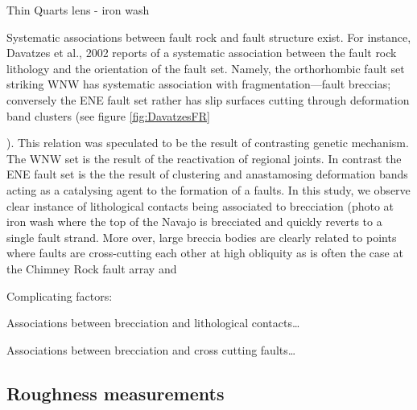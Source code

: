 \documentclass[12pt,a4paper]{article}
\begin{document}
{Thin Quarts lens
-	iron wash


Systematic associations between fault rock and fault structure exist. For instance, Davatzes et al., 2002 reports of a systematic association between the fault rock lithology and the orientation of the fault set. Namely, the orthorhombic fault set striking WNW has systematic association with fragmentation—fault breccias; conversely the ENE fault set rather has slip surfaces cutting through deformation band clusters (see figure \ref{fig:DavatzesFR}}). This relation was speculated to be the result of contrasting genetic mechanism. The WNW set is the result of the reactivation of regional joints. In contrast the ENE fault set is the the result of clustering and anastamosing deformation bands acting as a catalysing agent to the formation of a faults.
In this study, we observe clear instance of lithological contacts being associated to brecciation (photo at iron wash where the top of the Navajo is brecciated and quickly reverts to a single fault strand. More over, large breccia bodies are clearly related to points where faults are cross-cutting each other at high obliquity as is often the case at the Chimney Rock fault array and 

Complicating factors:

Associations between brecciation and lithological contacts…

Associations between brecciation and cross cutting faults…

		

\subsection{Roughness measurements}
\end{document}

